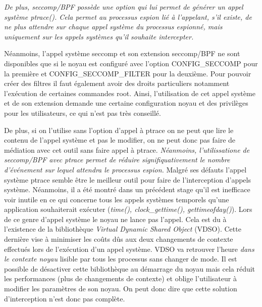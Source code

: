\textit{ De plus, seccomp/BPF possède une option qui lui permet de générer un
  appel système ptrace(). Cela permet au processus espion lié à l'appelant, s'il
  existe, de ne plus attendre sur chaque appel système du processus espionné,
  mais uniquement sur les appels systèmes qu'il souhaite intercepter.}

Néanmoins, l'appel système seccomp et son extension seccomp/BPF ne sont
disponibles que si le noyau est configuré avec l'option CONFIG\_SECCOMP pour la
première et CONFIG\_SECCOMP\_FILTER pour la deuxième. Pour pouvoir créer des
filtres il faut également avoir des droits particuliers notamment l'exécution de
certaines commandes root. Ainsi, l'utilisation de cet appel système et de son
extension demande une certaine configuration noyau et des privilèges pour les
utilisateurs, ce qui n'est pas très conseillé.

De plus, si on l'utilise sans l'option d'appel à ptrace on ne peut que lire le
contenu de l'appel système et pas le modifier, on ne peut donc pas faire de
médiation avec cet outil sans faire appel à ptrace. \textit{Néanmoins,
  l'utilissatione de seccomp/BPF avec ptrace permet de réduire
  signifiquativement le nombre d'événement sur lequel attendra le processus
  espion.}
\newline
Malgré ses défauts l'appel système ptrace semble être le meilleur outil pour
faire de l'interception d'appels système. Néanmoins, il a été montré dans un
précédent stage \citet{INTERCEPTIONMARION} qu'il est
inefficace voir inutile en ce qui concerne tous les appels systèmes temporels
qu'une application souhaiterait exécuter (\textit{time(), clock\_gettime(),
  gettimeofday()}). Lors de ce genre d'appel système le noyau ne lance pas
l'appel. Cela est du à l'existence de la bibliothèque \textit{Virtual Dynamic
  Shared Object} (VDSO). Cette dernière vise à minimiser les coûts dûs aux deux
changements de contexte effectués lors de l'exécution d'un appel système. VDSO
va retrouver l'heure \textit{{\color{red}dans le contexte noyau}} lisible par tous les
processus sans changer de mode. Il est possible de désactiver cette bibliothèque
au démarrage du noyau mais cela réduit les performances (plus de changements de
contexte) et oblige l'utilisateur à modifier les paramètres de son noyau. On
peut donc dire que cette solution d'interception n'est donc pas complète.



